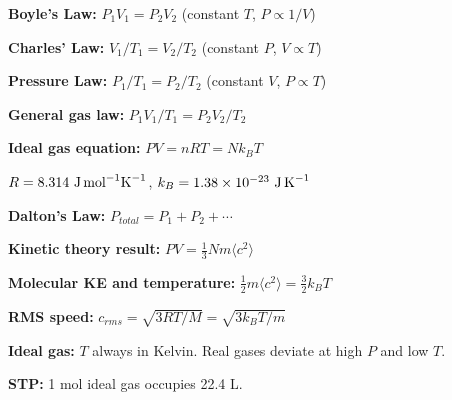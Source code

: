 \begin{summarybox}
\textbf{Boyle's Law:} $P_1V_1 = P_2V_2$
(constant $T$, $P \propto 1/V$)

\textbf{Charles' Law:} $V_1/T_1 = V_2/T_2$
(constant $P$, $V \propto T$)

\textbf{Pressure Law:} $P_1/T_1 = P_2/T_2$
(constant $V$, $P \propto T$)

\textbf{General gas law:}
$P_1V_1/T_1 = P_2V_2/T_2$

\textbf{Ideal gas equation:}
$PV = nRT = Nk_BT$

$R = 8.314\ \text{J\,mol}^{-1}\text{K}^{-1}$,
$k_B = 1.38\times10^{-23}\ \text{J\,K}^{-1}$

\textbf{Dalton's Law:}
$P_{total} = P_1 + P_2 + \cdots$

\textbf{Kinetic theory result:}
$PV = \frac{1}{3}Nm\langle c^2\rangle$

\textbf{Molecular KE and temperature:}
$\frac{1}{2}m\langle c^2\rangle = \frac{3}{2}k_BT$

\textbf{RMS speed:}
$c_{rms} = \sqrt{3RT/M} = \sqrt{3k_BT/m}$

\textbf{Ideal gas:} $T$ always in Kelvin.
Real gases deviate at high $P$ and low $T$.

\textbf{STP:} 1 mol ideal gas occupies 22.4 L.
\end{summarybox}

